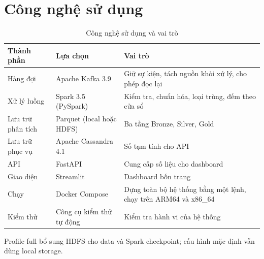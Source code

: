 \section{Công nghệ sử dụng}
\begin{table}[H]
\centering\small
\caption{Công nghệ sử dụng và vai trò}\label{tab:congnghe}
\begin{tabularx}{\linewidth}{@{}llX@{}}
\toprule
\textbf{Thành phần} & \textbf{Lựa chọn} & \textbf{Vai trò} \\ \midrule
Hàng đợi & Apache Kafka 3.9 & Giữ sự kiện, tách nguồn khỏi xử lý, cho phép đọc lại \\
Xử lý luồng & Spark 3.5 (PySpark) & Kiểm tra, chuẩn hóa, loại trùng, đếm theo cửa sổ \\
Lưu trữ phân tích & Parquet (local hoặc HDFS) & Ba tầng Bronze, Silver, Gold \\
Lưu trữ phục vụ & Apache Cassandra 4.1 & Số tạm tính cho API \\
API & FastAPI & Cung cấp số liệu cho dashboard \\
Giao diện & Streamlit & Dashboard bốn trang \\
Chạy & Docker Compose & Dựng toàn bộ hệ thống bằng một lệnh, chạy trên ARM64 và x86\_64 \\
Kiểm thử & Công cụ kiểm thử tự động & Kiểm tra hành vi của hệ thống \\
\bottomrule
\end{tabularx}
\end{table}
Profile full bổ sung HDFS cho data và Spark checkpoint; cấu hình mặc định vẫn dùng local storage.

